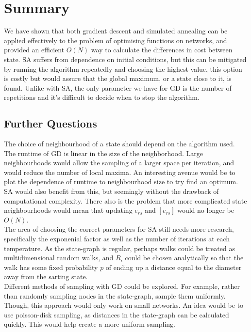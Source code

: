 \documentclass[9pt,twocolumn,twoside,lineno]{pnas-new}
\begin{document}
\section*{Summary}
We have shown that both gradient descent and simulated annealing can be applied effectively to the problem of optimising functions on networks, and provided an efficient $O(N)$ way to calculate the differences in cost between state. SA suffers from dependence on initial conditions, but this can be mitigated by running the algorithm repeatedly and choosing the highest value, this option is costly but would assure that the global maximum, or a state close to it, is found. Unlike with SA, the only parameter we have for GD is the number of repetitions and it's difficult to decide when to stop the algorithm.    

\subsection*{Further Questions}
    The choice of neighbourhood of a state should depend on the algorithm used. The runtime of GD is linear in the size of the neighborhood. Large neighbourhoods would allow the sampling of a larger space per iteration, and would reduce the number of local maxima. An interesting avenue would be to plot the dependence of runtime to neighbourhood size to try find an optimum. SA would also benefit from this, but seemingly without the drawback of computational complexity. There also is the problem that more complicated state neighbourhoods would mean that updating $e_{rs}$ and $[e_{rs}]$ would no longer be  $O(N)$. \\The area of choosing the correct parameters for SA still needs more research, specifically the exponenial factor as well as the number of iterations at each temperature. As the state-graph is regular, perhaps walks could be treated as multidimensional random walks, and $R_i$ could be chosen analytically so that the walk has some fixed probability $p$ of ending up a distance equal to the diameter away from the sarting state. \\ 
Different methods of sampling with GD could be explored. For example, rather than randomly sampling nodes in the state-graph, sample them uniformly. Though, this approach would only work on small networks. An idea would be to use poisson-disk sampling, as distances in the state-graph can be calculated quickly. This would help create a more uniform sampling. 
\end{document}
